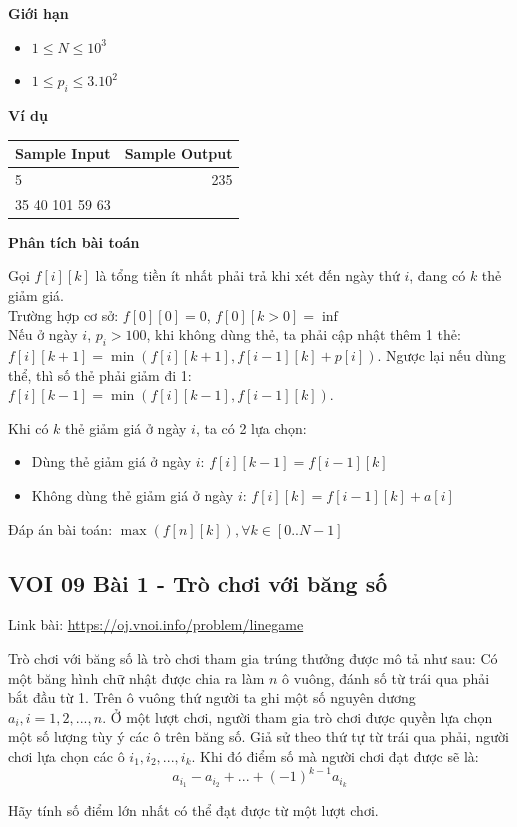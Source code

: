 \documentclass{article}
\begin{document}
\textbf{Giới hạn}
\begin{itemize}
    \item $1 \leq N \leq 10^3$
    \item $1 \leq p_i \leq 3.10^2$
\end{itemize}

\textbf{Ví dụ}

\begin{table}[h]
    \centering
    \begin{tabular}{|l|r|}
        \hline
        \textbf{Sample Input} & \textbf{Sample Output} \\
        \hline
		5& 235\\ 
		35 40 101 59 63&  \\ 
		\hline
    \end{tabular}
\end{table}

\textbf{Phân tích bài toán}

Gọi $f[i][k]$ là tổng tiền ít nhất phải trả khi xét đến ngày thứ $i$, đang có $k$ thẻ giảm giá.\\

Trường hợp cơ sở: $f[0][0] = 0$, $f[0][k > 0] = \inf$ \\

Nếu ở ngày $i$, $p_i > 100$, khi không dùng thẻ, ta phải cập nhật thêm 1 thẻ: $f[i][k + 1] = \min(f[i][k + 1], f[i - 1][k] + p[i])$. Ngược lại nếu dùng thể, thì số thẻ phải giảm đi 1: $f[i][k - 1] = \min(f[i][k - 1], f[i - 1][k])$.

Khi có $k$ thẻ giảm giá ở ngày $i$, ta có 2 lựa chọn: 
\begin{itemize}
    \item Dùng thẻ giảm giá ở ngày $i$: $f[i][k - 1] = f[i - 1][k]$
    \item Không dùng thẻ giảm giá ở ngày $i$: $f[i][k] = f[i - 1][k] + a[i]$
\end{itemize}

Đáp án bài toán: $\max(f[n][k]), \forall k \in [0..N - 1]$

\subsection{VOI 09 Bài 1 - Trò chơi với băng số}
Link bài: \url{https://oj.vnoi.info/problem/linegame}

\begin{tcolorbox}[
    colback=blue!5,        %
    colframe=blue!75!black,%
    title={Đề bài}
]
Trò chơi với băng số là trò chơi tham gia trúng thưởng được mô tả như sau: Có một băng hình chữ nhật được chia ra làm $n$ ô vuông, đánh số từ trái qua phải bắt đầu từ 1. Trên ô vuông thứ 
 người ta ghi một số nguyên dương $a_i, i = 1, 2, ..., n$. Ở một lượt chơi, người tham gia trò chơi được quyền lựa chọn một số lượng tùy ý các ô trên băng số. Giả sử theo thứ tự từ trái qua phải, người chơi lựa chọn các ô $i_1, i_2,..., i_k$. Khi đó điểm số mà người chơi đạt được sẽ là:
\[
a_{i_1} - a_{i_2} + ... + (-1)^{k - 1}a_{i_k}
\]

Hãy tính số điểm lớn nhất có thể đạt được từ một lượt chơi.
\end{tcolorbox}
\end{document}
